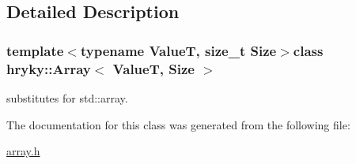 \subsection{Detailed Description}
\subsubsection*{template$<$typename Value\-T, size\-\_\-t Size$>$class hryky\-::\-Array$<$ Value\-T, Size $>$}

substitutes for std\-::array. 

The documentation for this class was generated from the following file\-:\begin{DoxyCompactItemize}
\item 
\hyperlink{array_8h}{array.\-h}\end{DoxyCompactItemize}
